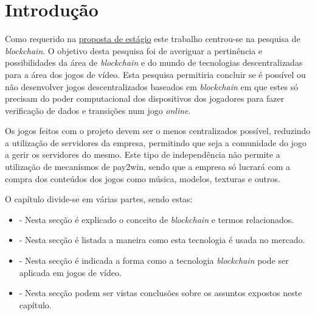 
\section{Introdução}

Como requerido na \hyperref[anexo:A]{proposta de estágio} este trabalho centrou-se na pesquisa de \textit{blockchain}. O objetivo desta pesquisa foi de averiguar a pertinência e possibilidades da área de \textit{blockchain} e do mundo de tecnologias descentralizadas para a área dos jogos de vídeo. Esta pesquisa permitiria concluir se é possível ou não desenvolver jogos descentralizados baseados em \textit{blockchain} em que estes só precisam do poder computacional dos dispositivos dos jogadores para fazer verificação de dados e transições num jogo \textit{online}.

Os jogos feitos com o projeto \gamechaining{} devem ser o menos centralizados possível, reduzindo a utilização de servidores da empresa, permitindo que seja a comunidade do jogo a gerir os servidores do mesmo. Este tipo de independência não permite a utilização de mecanismos de \gls{pay2win}, sendo que a empresa só lucrará com a compra dos conteúdos dos jogos como música, modelos, texturas e outros.

O capítulo divide-se em várias partes, sendo estas:

\begin{itemize}
  \item \underline{} - Nesta secção é explicado o conceito de \textit{blockchain} e termos relacionados.
  
  \item \underline{} - Nesta secção é listada a maneira como esta tecnologia é usada no mercado.
  \item \underline{} - Nesta secção é indicada a forma como a tecnologia \textit{blockchain} pode ser aplicada em jogos de vídeo.
  \item \underline{} - Nesta secção podem ser vistas conclusões sobre os assuntos expostos neste capítulo.
\end{itemize}